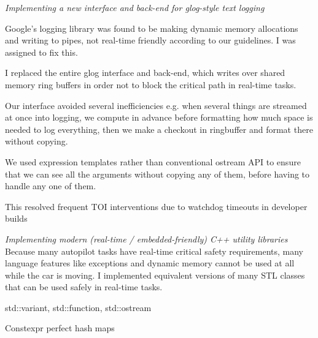 \documentclass[margin,line]{resume}
\begin{document}
\begin{resume}
\newpage

    \textsl{Implementing a new interface and back-end for glog-style text logging}
    \begin{list2}
    \item Google's logging library was found to be making dynamic memory allocations and writing to pipes, not real-time friendly
    according to our guidelines. I was assigned to fix this.
    \item I replaced the entire glog interface and back-end, which writes over shared memory ring buffers in order not to block the critical
    path in real-time tasks.
    \item Our interface avoided several inefficiencies e.g. when several things are streamed at once into logging, we compute in advance before
    formatting how much space is needed to log everything, then we make a checkout in ringbuffer and format there without copying.
    \item We used expression templates rather than conventional ostream API to ensure that we can see all the arguments without copying any of them,
    before having to handle any one of them.
    \item This resolved frequent TOI interventions due to watchdog timeouts in developer builds
    \end{list2}

    \textsl{Implementing modern (real-time / embedded-friendly) C++ utility libraries} \\
    Because many autopilot tasks have real-time critical safety requirements, many language features like exceptions
    and dynamic memory cannot be used at all while the car is moving. I implemented equivalent versions of many STL
    classes that can be used safely in real-time tasks.
    \begin{list2}
    \item \textrm{std::variant}, \textrm{std::function}, \textrm{std::ostream}
    \item Constexpr perfect hash maps
    \end{list2}


\end{resume}
\end{document}
